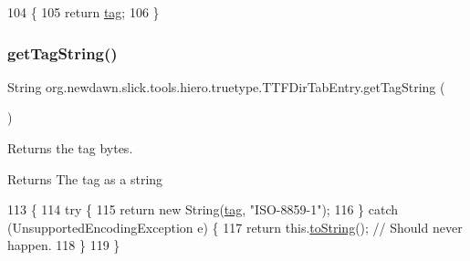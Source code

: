 \begin{DoxyCode}
104                            \{
105         \textcolor{keywordflow}{return} \mbox{\hyperlink{classorg_1_1newdawn_1_1slick_1_1tools_1_1hiero_1_1truetype_1_1_t_t_f_dir_tab_entry_a77d2cd970e9bd38e996a73f6d46122d7}{tag}};
106     \}
\end{DoxyCode}
\mbox{\label{classorg_1_1newdawn_1_1slick_1_1tools_1_1hiero_1_1truetype_1_1_t_t_f_dir_tab_entry_a8255e71e87e320046aabbfc6bbc43c98}} 
\subsubsection{\texorpdfstring{get\+Tag\+String()}{getTagString()}}
{\footnotesize\ttfamily String org.\+newdawn.\+slick.\+tools.\+hiero.\+truetype.\+T\+T\+F\+Dir\+Tab\+Entry.\+get\+Tag\+String (\begin{DoxyParamCaption}{ }\end{DoxyParamCaption})\hspace{0.3cm}{\ttfamily [inline]}}

Returns the tag bytes.

\begin{DoxyReturn}{Returns}
The tag as a string 
\end{DoxyReturn}

\begin{DoxyCode}
113                                  \{
114         \textcolor{keywordflow}{try} \{
115             \textcolor{keywordflow}{return} \textcolor{keyword}{new} String(\mbox{\hyperlink{classorg_1_1newdawn_1_1slick_1_1tools_1_1hiero_1_1truetype_1_1_t_t_f_dir_tab_entry_a77d2cd970e9bd38e996a73f6d46122d7}{tag}}, \textcolor{stringliteral}{"ISO-8859-1"});
116         \} \textcolor{keywordflow}{catch} (UnsupportedEncodingException e) \{
117             \textcolor{keywordflow}{return} this.\mbox{\hyperlink{classorg_1_1newdawn_1_1slick_1_1tools_1_1hiero_1_1truetype_1_1_t_t_f_dir_tab_entry_a2f3e98d83d98f93e243dd0e95edb7528}{toString}}(); \textcolor{comment}{// Should never happen.}
118         \}
119     \}
\end{DoxyCode}
\mbox{\label{classorg_1_1newdawn_1_1slick_1_1tools_1_1hiero_1_1truetype_1_1_t_t_f_dir_tab_entry_ae3c59df627d61204b187beea3c802654}} 

